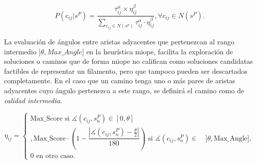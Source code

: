 \begin{equation}
P(c_{ij} | s^{P}) = \frac
        {\tau_{ij}^{\alpha} \times \eta_{ij}^{\beta}}
        {\sum\limits_{c_{ij}\in N(s^p)}{\tau_{ij}^{\alpha} \cdot \eta_{ij}^{\beta} } }, \forall c_{ij} \in N(s^{P}).
\label{eq:antProbabilities}
\end{equation}

La evaluaci\'on de \'angulos entre aristas adyacentes que pertenezcan al rango intermedio $]\theta, Max\_Angle]$ en la heur\'istica miope, facilita la exploraci\'on de soluciones o caminos que de forma miope no califican como soluciones candidatas factibles de representar un filamento, pero que tampoco pueden ser descartados completamente. En el caso que un camino tenga uno o m\'as pares de aristas adyacentes cuyo \'angulo pertenezca a este rango, se definir\'a el camino como de {\it calidad intermedia}.


\begin{equation}
    \eta_{ij} = 
        \begin{cases} 
        \text{Max\_Score si } \measuredangle(c_{ij}, s_{n}^{P}) \in [0, \theta]\\[3ex],
        
        \text{Max\_Score} \cdot \left(1 - \dfrac{ \left| \measuredangle(c_{ij}, s_{n}^{P}) - \frac{\theta}{2} \right|} {180} \right)  \text{ si } \measuredangle(c_{ij}, s_{n}^{P}) \in \quad ]\theta, \text{Max\_Angle}],\\[3ex]
        
        \text{0 en otro caso.}
        \end{cases}
    \label{eq:heuristicaMiope}
\end{equation}

